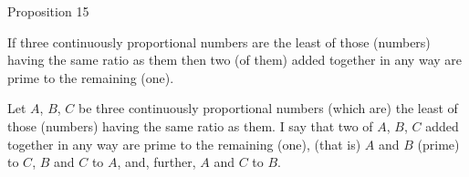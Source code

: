 
\begin{center}
{\large Proposition 15}
\end{center}

If three continuously proportional
numbers are the least of those (numbers) having the same ratio as them then
two (of them) added together in any way are prime to the remaining (one).

\centerline{}

Let $A$, $B$, $C$ be three continuously proportional numbers (which are)
the least of those (numbers) having the same ratio as them. I say that two
of $A$, $B$, $C$ added together in any way are prime to the remaining
(one), (that is) $A$ and $B$ (prime) to $C$, $B$ and $C$ to
$A$, and, further, $A$ and $C$ to $B$.

